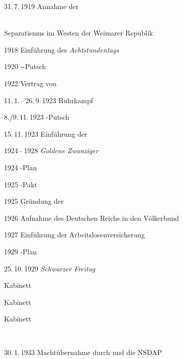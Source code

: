 \begin{chronik}
\item[31.\,7.\,1919]
Annahme der 

\ \\

\longitem[1919\,--\,November 1923]
Separatismus im Westen der Weimarer Republik

\item[1918]
Einführung des \emph{Achtstundentags}

\item[1920]
--Putsch

\item[1922]
Vertrag von 

\item[11.\,1.\,--\,26.\,9.\,1923]
Ruhrkampf

\item[8./9.\,11.\,1923]
-Putsch

\item[15.\,11.\,1923]
Einführung der 

\item[1924\,--\,1928]
\emph{Goldene Zwanziger}

\item[1924]
-Plan

\item[1925]
-Pakt

\item[1925]
Gründung der \textsf{}

\item[1926]
Aufnahme des Deutschen Reichs in den Völkerbund

\item[1927]
Einführung der Arbeitslosenversicherung

\item[1929]
-Plan

\item[25.\,10.\,1929]
\emph{Schwarzer Freitag}

\longitem[29.\,3.\,1930\,--\,30.\,5.\,1932]
Kabinett 

\longitem[1.\,6.\,--\,17.\,11.\,1932]
Kabinett 

\longitem[3.\,12.\,1932\,--\,29.\,1.\,1933]
Kabinett 

\ \\

\item[30.\,1.\,1933]
Machtübernahme durch  und die NSDAP


\end{chronik}
